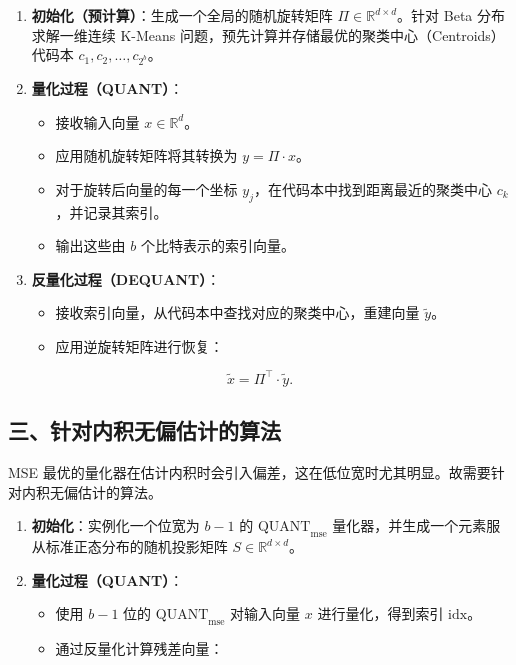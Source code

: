 \begin{enumerate}
\def\labelenumi{\arabic{enumi}.}
\tightlist
\item
  \textbf{初始化（预计算）}：生成一个全局的随机旋转矩阵 \(\Pi \in \mathbb{R}^{d \times d}\)。针对 Beta 分布求解一维连续 K-Means 问题，预先计算并存储最优的聚类中心（Centroids）代码本 \(c_1,c_2,\ldots,c_{2^b}\)。
\item
  \textbf{量化过程（QUANT）}：

  \begin{itemize}
  \tightlist
  \item
    接收输入向量 \(x \in \mathbb{R}^d\)。
  \item
    应用随机旋转矩阵将其转换为 \(y = \Pi \cdot x\)。
  \item
    对于旋转后向量的每一个坐标 \(y_j\)，在代码本中找到距离最近的聚类中心 \(c_k\)，并记录其索引。
  \item
    输出这些由 \(b\) 个比特表示的索引向量。
  \end{itemize}
\item
  \textbf{反量化过程（DEQUANT）}：

  \begin{itemize}
  \tightlist
  \item
    接收索引向量，从代码本中查找对应的聚类中心，重建向量 \(\tilde{y}\)。
  \item
    应用逆旋转矩阵进行恢复：
  \end{itemize}
\end{enumerate}

\[
\tilde{x} = \Pi^\top \cdot \tilde{y}.
\]

\hypertarget{ux4e09ux9488ux5bf9ux5185ux79efux65e0ux504fux4f30ux8ba1ux7684ux7b97ux6cd5}{%
\subsection{三、针对内积无偏估计的算法}\label{ux4e09ux9488ux5bf9ux5185ux79efux65e0ux504fux4f30ux8ba1ux7684ux7b97ux6cd5}}

MSE 最优的量化器在估计内积时会引入偏差，这在低位宽时尤其明显。故需要针对内积无偏估计的算法。

\begin{enumerate}
\def\labelenumi{\arabic{enumi}.}
\tightlist
\item
  \textbf{初始化}：实例化一个位宽为 \(b-1\) 的 \(\mathrm{QUANT}_{\mathrm{mse}}\) 量化器，并生成一个元素服从标准正态分布的随机投影矩阵 \(S \in \mathbb{R}^{d \times d}\)。
\item
  \textbf{量化过程（QUANT）}：

  \begin{itemize}
  \tightlist
  \item
    使用 \(b-1\) 位的 \(\mathrm{QUANT}_{\mathrm{mse}}\) 对输入向量 \(x\) 进行量化，得到索引 \(\mathrm{idx}\)。
  \item
    通过反量化计算残差向量：
  \end{itemize}
\end{enumerate}

